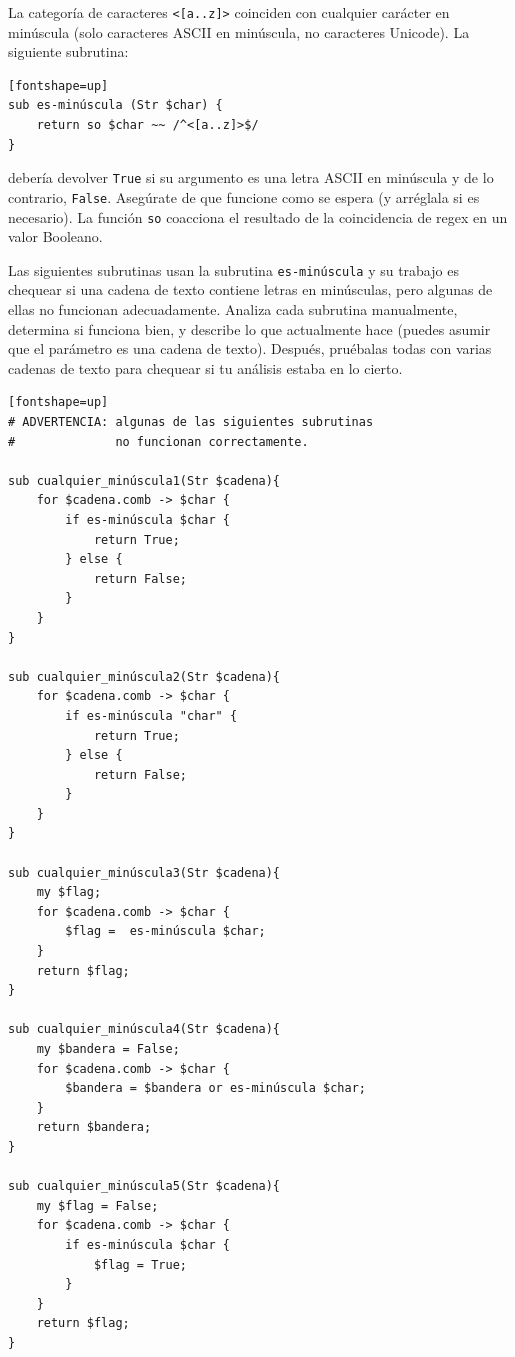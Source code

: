 \begin{exercise}

\label{islower}
La categoría de caracteres \verb|<[a..z]>| coinciden con cualquier
carácter en minúscula (solo caracteres ASCII en minúscula, no caracteres
Unicode). La siguiente subrutina:

\begin{verbatim}[fontshape=up]
sub es-minúscula (Str $char) { 
    return so $char ~~ /^<[a..z]>$/
}
\end{verbatim}

debería devolver {\tt True} si su argumento es una letra ASCII
en minúscula y de lo contrario, {\tt False}. Asegúrate de que 
funcione como se espera (y arréglala si es necesario). La 
función {\tt so} coacciona el resultado de la coincidencia de regex 
en un valor Booleano.

Las siguientes subrutinas usan la subrutina {\tt es-minúscula}
y su trabajo es chequear si una cadena de texto contiene 
letras en minúsculas, pero algunas de ellas no funcionan 
adecuadamente. Analiza cada subrutina manualmente, 
determina si funciona bien, y describe lo que actualmente
hace (puedes asumir que el parámetro es una cadena de texto).
Después, pruébalas todas con varias cadenas de texto para chequear
si tu análisis estaba en lo cierto.

\begin{verbatim}[fontshape=up]
# ADVERTENCIA: algunas de las siguientes subrutinas
#              no funcionan correctamente.

sub cualquier_minúscula1(Str $cadena){
    for $cadena.comb -> $char {
        if es-minúscula $char {
            return True;
        } else {
            return False;
        }
    }
}

sub cualquier_minúscula2(Str $cadena){
    for $cadena.comb -> $char {
        if es-minúscula "char" {
            return True;
        } else {
            return False;
        }
    }
}

sub cualquier_minúscula3(Str $cadena){
    my $flag;
    for $cadena.comb -> $char {
        $flag =  es-minúscula $char;
    }
    return $flag;
}

sub cualquier_minúscula4(Str $cadena){
    my $bandera = False;
    for $cadena.comb -> $char {
        $bandera = $bandera or es-minúscula $char;
    }
    return $bandera;
}

sub cualquier_minúscula5(Str $cadena){
    my $flag = False;
    for $cadena.comb -> $char {
        if es-minúscula $char {
            $flag = True;
        }
    }
    return $flag;
}


\end{verbatim}
\end{exercise}
